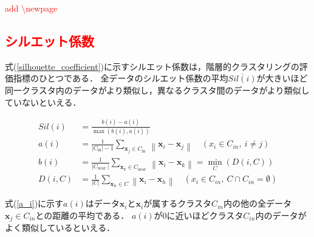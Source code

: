 \documentclass[12pt,a4j]{jreport}
\begin{document}





\textcolor{red}{add \textbackslash newpage}
\newpage

\subsection{\textcolor{red}{シルエット係数}}
式(\ref{silhouette_coefficient})に示すシルエット係数は，階層的クラスタリングの評価指標のひとつである\cite{aranganayagi_clustering_2007}．
全データのシルエット係数の平均$\overline{Sil(i)}$が大きいほど同一クラスタ内のデータがより類似し，異なるクラスタ間のデータがより類似していないといえる．

\begin{align}
  Sil(i) &= \frac{b(i) - a(i)}{\max ( b(i) , a(i))}
  \label{silhouette_coefficient}
  \\
  a(i)
  &=\frac{1}{\left|C_{\text {in}}\right|-1} \sum_{\boldsymbol{x}_{j} \in C_{\text {in }}}\left\|\boldsymbol{x}_{i}-\boldsymbol{x}_{j}\right\|
  \quad(x_i \in C_{in} ,~ i \neq j)
  \label{a_i}
  \\
  b(i)
  &=\frac{1}{\left|C_{\text {near }}\right|} \sum_{\boldsymbol{x}_{k} \in C_{\text {near }}}\left\|\boldsymbol{x}_{i}-\boldsymbol{x}_{k}\right\|
  = \min_C{\left( D(i, C) \right)}
  \label{b_i}
  \\
  D(i, C)
  &=\frac{1}{\left|C \right|} \sum_{\boldsymbol{x}_{h} \in C}\left\|\boldsymbol{x}_{i}-\boldsymbol{x}_{h}\right\|
  \quad (x_i \in C_{in},~ C \cap C_{in} = \emptyset)
  \label{d_ic}
\end{align}

式(\ref{a_i})に示す$a(i)$はデータ$\bm{x}_i$と$\bm{x}_i$が属するクラスタ$C_{in}$内の他の全データ$\bm{x}_j \in C_{in}$との距離の平均である．
$a(i)$が0に近いほどクラスタ$C_{in}$内のデータがよく類似しているといえる．
\end{document}
